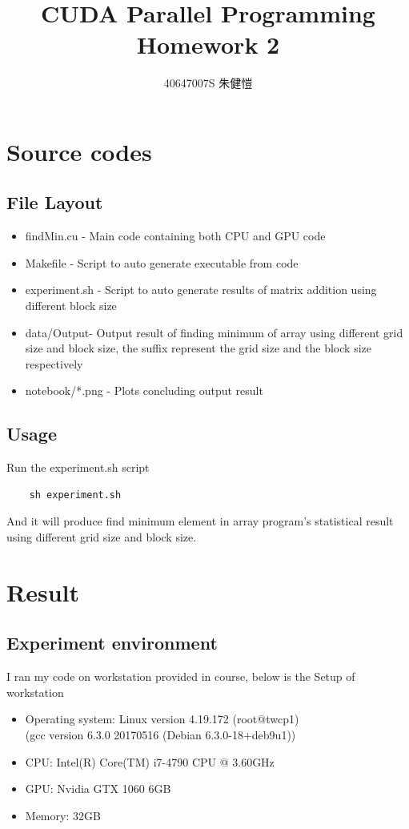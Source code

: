 \documentclass{article}
\title{CUDA Parallel Programming\\Homework 2}
\author{40647007S 朱健愷}
\begin{document}
	\maketitle
	\section{Source codes}
	\subsection{File Layout}
	\begin{itemize}
		\item findMin.cu - Main code containing both CPU and GPU code
		\item Makefile - Script to auto generate executable from code
		\item experiment.sh - Script to auto generate results of matrix addition using different block size
		\item data/Output\textunderscore* - Output result of finding minimum of array using different grid size and block size, the suffix represent the grid size and the block size respectively
		\item notebook/*.png - Plots concluding output result
	\end{itemize}
	
	
	\subsection{Usage}
	Run the experiment.sh script
	
	\begin{verbatim}
	sh experiment.sh
	\end{verbatim}
	
	And it will produce find minimum element in array program's statistical result using different grid size and block size.
	\section{Result}
	\subsection{Experiment environment}
	I ran my code on workstation provided in course, below is the Setup of workstation
	\begin{itemize}
		\item Operating system: Linux version 4.19.172 (root@twcp1)\\(gcc version 6.3.0 20170516 (Debian 6.3.0-18+deb9u1))
		\item CPU: Intel(R) Core(TM) i7-4790 CPU @ 3.60GHz
		\item GPU: Nvidia GTX 1060 6GB
		\item Memory: 32GB 
	\end{itemize}
\end{document}
